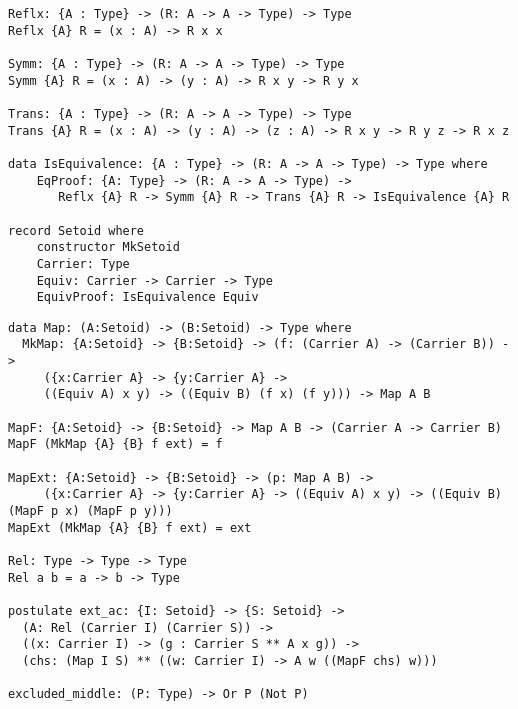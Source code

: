 \documentclass[aspectratio=169,dvipsnames,usenames]{beamer}
\begin{document}
\begin{frame}[fragile]{}
\small
\begin{verbatim}
Reflx: {A : Type} -> (R: A -> A -> Type) -> Type
Reflx {A} R = (x : A) -> R x x

Symm: {A : Type} -> (R: A -> A -> Type) -> Type
Symm {A} R = (x : A) -> (y : A) -> R x y -> R y x

Trans: {A : Type} -> (R: A -> A -> Type) -> Type
Trans {A} R = (x : A) -> (y : A) -> (z : A) -> R x y -> R y z -> R x z

data IsEquivalence: {A : Type} -> (R: A -> A -> Type) -> Type where
    EqProof: {A: Type} -> (R: A -> A -> Type) -> 
       Reflx {A} R -> Symm {A} R -> Trans {A} R -> IsEquivalence {A} R

record Setoid where
    constructor MkSetoid
    Carrier: Type
    Equiv: Carrier -> Carrier -> Type
    EquivProof: IsEquivalence Equiv
\end{verbatim}
\end{frame}

\begin{frame}[fragile]{}
\footnotesize
\begin{verbatim}
data Map: (A:Setoid) -> (B:Setoid) -> Type where
  MkMap: {A:Setoid} -> {B:Setoid} -> (f: (Carrier A) -> (Carrier B)) -> 
     ({x:Carrier A} -> {y:Carrier A} -> 
     ((Equiv A) x y) -> ((Equiv B) (f x) (f y))) -> Map A B

MapF: {A:Setoid} -> {B:Setoid} -> Map A B -> (Carrier A -> Carrier B)
MapF (MkMap {A} {B} f ext) = f

MapExt: {A:Setoid} -> {B:Setoid} -> (p: Map A B) -> 
     ({x:Carrier A} -> {y:Carrier A} -> ((Equiv A) x y) -> ((Equiv B) (MapF p x) (MapF p y)))
MapExt (MkMap {A} {B} f ext) = ext

Rel: Type -> Type -> Type
Rel a b = a -> b -> Type

postulate ext_ac: {I: Setoid} -> {S: Setoid} -> 
  (A: Rel (Carrier I) (Carrier S)) -> 
  ((x: Carrier I) -> (g : Carrier S ** A x g)) ->
  (chs: (Map I S) ** ((w: Carrier I) -> A w ((MapF chs) w)))

excluded_middle: (P: Type) -> Or P (Not P)
\end{verbatim}
\end{frame}
\end{document}
